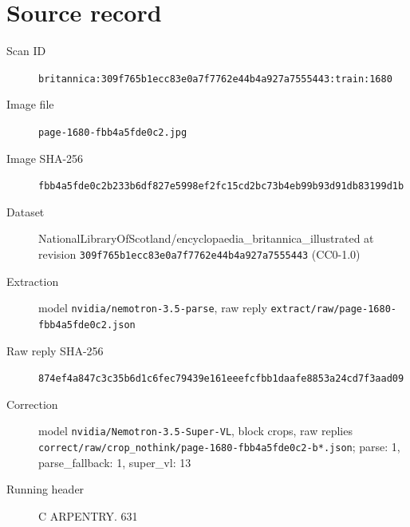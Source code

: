 \documentclass{article}
\begin{document}
\section*{Source record}
\begin{description}
\item[Scan ID] \texttt{britannica:309f765b1ecc83e0a7f7762e44b4a927a7555443:train:1680}
\item[Image file] \texttt{page-1680-fbb4a5fde0c2.jpg}
\item[Image SHA-256] \texttt{fbb4a5fde0c2b233b6df827e5998ef2fc15cd2bc73b4eb99b93d91db83199d1b}
\item[Dataset] NationalLibraryOfScotland/encyclopaedia\_britannica\_illustrated at revision \texttt{309f765b1ecc83e0a7f7762e44b4a927a7555443} (CC0-1.0)
\item[Extraction] model \texttt{nvidia/nemotron-3.5-parse}, raw reply \texttt{extract/raw/page-1680-fbb4a5fde0c2.json}
\item[Raw reply SHA-256] \texttt{874ef4a847c3c35b6d1c6fec79439e161eeefcfbb1daafe8853a24cd7f3aad09}
\item[Correction] model \texttt{nvidia/Nemotron-3.5-Super-VL}, block crops, raw replies \texttt{correct/raw/crop\_nothink/page-1680-fbb4a5fde0c2-b*.json}; parse: 1, parse\_fallback: 1, super\_vl: 13
\item[Running header] C ARPENTRY. 631
\end{description}
\end{document}
